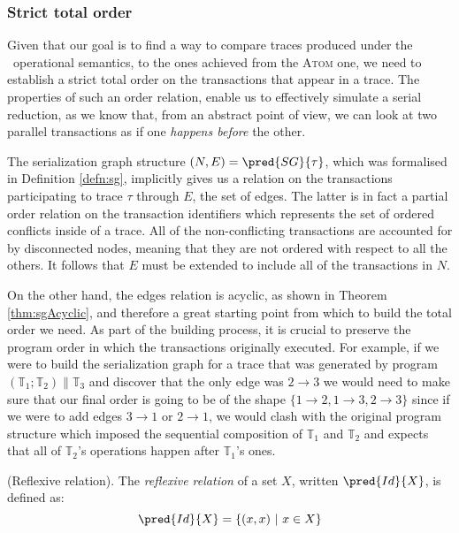 \subsubsection{Strict total order}

Given that our goal is to find a way to compare traces produced under the \tpl\ operational semantics, to the ones achieved from the \textsc{Atom} one, we need to establish a strict total order on the transactions that appear in a trace. The properties of such an order relation, enable us to effectively simulate a serial reduction, as we know that, from an abstract point of view, we can look at two parallel transactions as if one \textit{happens before} the other.

The serialization graph structure $(N, E) = \pred{SG}{\tau}$, which was formalised in Definition \ref{defn:sg}, implicitly gives us a relation on the transactions participating to trace $\tau$ through $E$, the set of edges. The latter is in fact a partial order relation on the transaction identifiers which represents the set of ordered conflicts inside of a trace. All of the non-conflicting transactions are accounted for by disconnected nodes, meaning that they are not ordered with respect to all the others. It follows that $E$ must be extended to include all of the transactions in $N$.

On the other hand, the edges relation is acyclic, as shown in Theorem \ref{thm:sgAcyclic}, and therefore a great starting point from which to build the total order we need. As part of the building process, it is crucial to preserve the program order in which the transactions originally executed. For example, if we were to build the serialization graph for a trace that was generated by program $\left( \mathds{T}_1 ; \mathds{T}_2 \right) \| \mathds{T}_3$ and discover that the only edge was $2 \rightarrow 3$ we would need to make sure that our final order is going to be of the shape $\{ 1 \rightarrow 2, 1 \rightarrow 3, 2 \rightarrow 3 \}$ since if we were to add edges $3 \rightarrow 1$ or $2 \rightarrow 1$, we would clash with the original program structure which imposed the sequential composition of $\mathds{T}_1$ and $\mathds{T}_2$ and expects that all of $\mathds{T}_2$'s operations happen after $\mathds{T}_1$'s ones.

\begin{defn}
	(Reflexive relation).
	The \emph{reflexive relation} of a set $X$, written $\pred{Id}{X}$, is defined as:
	\[
		\pred{Id}{X} = \{ (x, x)\ |\ x \in X \}
	\]
\end{defn}


